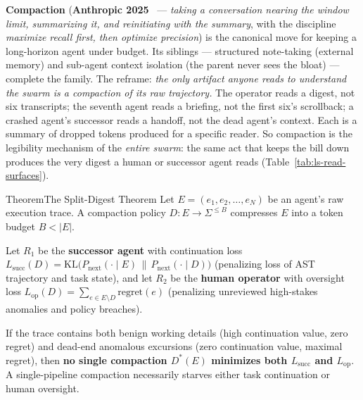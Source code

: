 \documentclass[11pt,a4paper]{article}
\theoremstyle{definition}
\theoremstyle{plain}
\begin{document}
\textbf{Compaction} (\textbf{Anthropic 2025}~ --- \emph{taking a
conversation nearing the window limit, summarizing it, and reinitiating with the
summary}, with the discipline \emph{maximize recall first, then optimize precision})
is the canonical move for keeping a long-horizon agent under budget. Its siblings ---
structured note-taking (external memory) and sub-agent context isolation (the parent
never sees the bloat) --- complete the family. The reframe: \emph{the only artifact
anyone reads to understand the swarm is a compaction of its raw trajectory.} The
operator reads a digest, not six transcripts; the seventh agent reads a briefing, not
the first six's scrollback; a crashed agent's successor reads a handoff, not the dead
agent's context. Each is a summary of dropped tokens produced for a specific reader.
So compaction is the legibility mechanism of the \emph{entire swarm}: the same act
that keeps the bill down produces the very digest a human or successor agent reads
(Table~\ref{tab:ls-read-surfaces}).

\begin{pdclaim}{Theorem}{The Split-Digest Theorem}
\setlength{\parskip}{4pt plus 1pt}
\label{thm:split-digest}
Let $E = (e_1, e_2, \dots, e_N)$ be an agent's raw execution trace. A compaction policy $D: E \to \Sigma^{\le B}$ compresses $E$ into a token budget $B < |E|$.

Let $R_1$ be the \textbf{successor agent} with continuation loss $L_{\mathrm{succ}}(D) = \mathrm{KL}\bigl(P_{\mathrm{next}}(\cdot \mid E) \,\|\, P_{\mathrm{next}}(\cdot \mid D)\bigr)$ (penalizing loss of AST trajectory and task state), and let $R_2$ be the \textbf{human operator} with oversight loss $L_{\mathrm{op}}(D) = \sum_{e \in E \setminus D} \mathrm{regret}(e)$ (penalizing unreviewed high-stakes anomalies and policy breaches).

If the trace contains both benign working details (high continuation value, zero regret) and dead-end anomalous excursions (zero continuation value, maximal regret), then \textbf{no single compaction $D^*(E)$ minimizes both $L_{\mathrm{succ}}$ and $L_{\mathrm{op}}$}. A single-pipeline compaction necessarily starves either task continuation or human oversight.
\end{pdclaim}
\end{document}
